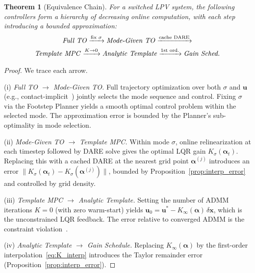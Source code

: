 \documentclass[letterpaper, 10pt, conference]{IEEEtran}
\newtheorem{theorem}{Theorem}
\newcommand{\balpha}{\bm{\alpha}}
\newcommand{\bx}{\bm{x}}
\newcommand{\bu}{\bm{u}}
\begin{document}
\begin{theorem}[Equivalence Chain]\label{thm:chain}
For a switched LPV system, the following controllers form a
hierarchy of decreasing online computation, with each step
introducing a bounded approximation:
\begin{multline}\label{eq:chain}
  \text{\emph{Full TO}}
  \xrightarrow{\text{fix } \sigma}
  \text{\emph{Mode-Given TO}}
  \xrightarrow{\text{cache DARE}}  \\
  \text{\emph{Template MPC}}
  \xrightarrow{K \to 0}
  \text{\emph{Analytic Template}}
  \xrightarrow{\text{1st ord.}}
  \text{\emph{Gain Sched.}}
\end{multline}
\end{theorem}

\begin{proof}
We trace each arrow.

(i) \emph{Full TO $\to$ Mode-Given TO.}
Full trajectory optimization over both $\sigma$
and $\bu$ (e.g., contact-implicit~\cite{posa2014})
jointly selects the mode sequence and control.
Fixing $\sigma$ via the Footstep Planner yields a
smooth optimal control problem within the selected mode.
The approximation error is bounded by the Planner's
sub-optimality in mode selection.

(ii) \emph{Mode-Given TO $\to$ Template MPC.}
Within mode $\sigma$, online relinearization at each
timestep followed by DARE solve gives the optimal
LQR gain $K_\sigma(\balpha_t)$.
Replacing this with a cached DARE at the nearest
grid point $\balpha^{(j)}$ introduces an error
$\|K_\sigma(\balpha_t) - K_\sigma(\balpha^{(j)})\|$,
bounded by Proposition~\ref{prop:interp_error}
and controlled by grid density.

(iii) \emph{Template MPC $\to$ Analytic Template.}
Setting the number of ADMM iterations $K = 0$
(with zero warm-start) yields
$\bu_0 = \bu^* - K_\infty(\balpha) \, \delta\bx$,
which is the unconstrained LQR feedback.
The error relative to converged ADMM is the
constraint violation~\cite{zhang2025flat}.

(iv) \emph{Analytic Template $\to$ Gain Schedule.}
Replacing $K_\infty(\balpha)$ by the first-order
interpolation~\eqref{eq:K_interp} introduces the
Taylor remainder error (Proposition~\ref{prop:interp_error}).
\end{proof}
\end{document}
